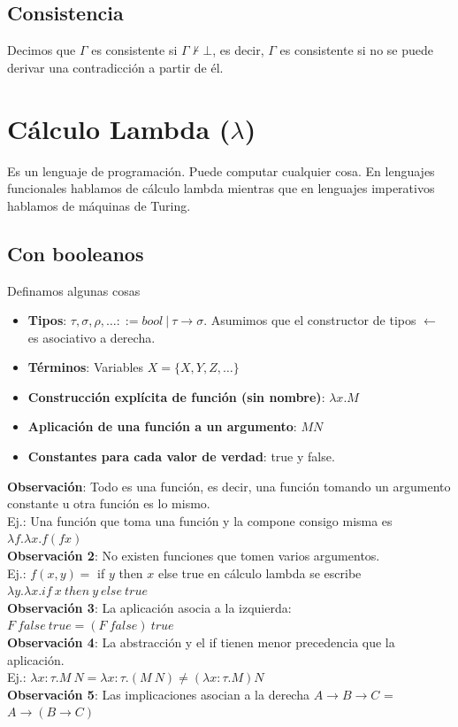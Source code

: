 \documentclass[10pt,a4paper]{article}
\begin{document}
\subsection*{Consistencia}
Decimos que $\Gamma$ es consistente si $\Gamma \nvdash \bot$, es decir, $\Gamma$ es consistente si no se puede derivar una contradicción a partir de él.
\section*{Cálculo Lambda ($\lambda$)}
Es un lenguaje de programación. Puede computar cualquier cosa. En lenguajes funcionales hablamos de cálculo lambda mientras que en lenguajes imperativos hablamos de máquinas de Turing. 
\subsection*{Con booleanos}
Definamos algunas cosas 
\begin{itemize}
    \item \textbf{Tipos}: $\tau, \sigma, \rho, \dots ::= bool \ | \ \tau \rightarrow \sigma$. 
    Asumimos que el constructor de tipos $\leftarrow$ es asociativo a derecha.
    \item \textbf{Términos}: Variables $X = \{X, Y, Z, \dots\}$
    \item \textbf{Construcción explícita de función (sin nombre)}: $\lambda x . M$ 
    \item \textbf{Aplicación de una función a un argumento}: $MN$ 
    \item \textbf{Constantes para cada valor de verdad}: true y false.
\end{itemize}
\textbf{Observación}: Todo es una función, es decir, una función tomando un argumento constante u otra función es lo mismo. \\
Ej.: Una función que toma una función y la compone consigo misma es $\lambda f . \lambda x . f(fx)$ \\
\textbf{Observación 2}: No existen funciones que tomen varios argumentos. \\ 
Ej.: $f(x,y) = $ if $y$ then $x$ else true en cálculo lambda se escribe $\lambda y . \lambda x . if \ x \ then \ y \ else \ true$ \\
\textbf{Observación 3}: La aplicación asocia a la izquierda: $F \ false \ true = (F \ false) \ true$ \\
\textbf{Observación 4}: La abstracción y el if tienen menor precedencia que la aplicación. \\
Ej.: $\lambda x:\tau . M \ N = \lambda x : \tau . (M \ N) \neq (\lambda x : \tau . M) N$ \\
\textbf{Observación 5}: Las implicaciones asocian a la derecha $A \rightarrow B \rightarrow C$ = $A \rightarrow (B \rightarrow C)$
\end{document}
